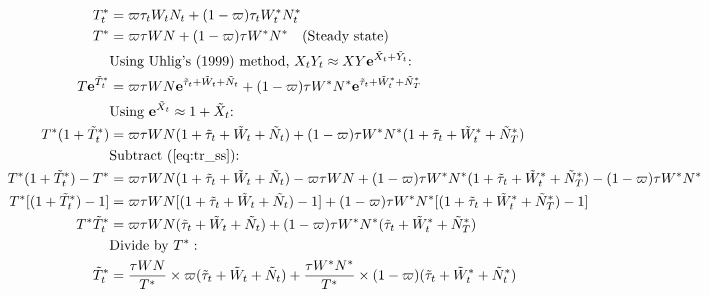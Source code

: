 \pagebreak
\tiny
\begin{align}
    T^*_t &= \varpi\tau_t W_t N_t + (1-\varpi)\tau_t W^*_t N^*_t \\
    T^* &= \varpi\tau W N + (1-\varpi)\tau W^* N^* \label{eq:tr_ss} \quad \text{(Steady state)}\\
    &\text{Using Uhlig's (1999) method, $X_tY_t \approx XY\mathbf{e}^{\tilde{X}_t + \tilde{Y}_t}$: }\\
    T\mathbf{e}^{\tilde{T}^*_t} &= \varpi \tau W N \mathbf{e}^{\tilde{\tau}_t+\tilde{W}_t+\tilde{N}_t} + (1-\varpi) \tau W^* N^* \mathbf{e}^{\tilde{\tau}_t+\tilde{W}^*_t+\tilde{N}^*_T} \\
    &\text{Using $\mathbf{e}^{\tilde{X}_t} \approx 1 + {\tilde{X}_t}$: }\\
    T^* (1 + {\tilde{T}^*_t}) &= \varpi \tau W N (1 + {\tilde{\tau}_t+\tilde{W}_t+\tilde{N}_t}) + (1-\varpi) \tau W^* N^* (1 + {\tilde{\tau}_t+\tilde{W}^*_t+\tilde{N}^*_T}) \\
    &\text{Subtract (\ref{eq:tr_ss}): } \\
    T^* (1 + {\tilde{T}^*_t}) - T^* &= \varpi \tau W N (1 + {\tilde{\tau}_t+\tilde{W}_t+\tilde{N}_t}) - \varpi\tau W N + (1-\varpi) \tau W^* N^* (1 + {\tilde{\tau}_t+\tilde{W}^*_t+\tilde{N}^*_T}) - (1-\varpi)\tau W^* N^* \\
    T^*[(1 + {\tilde{T}^*_t}) - 1] &= \varpi \tau W N [(1 + {\tilde{\tau}_t+\tilde{W}_t+\tilde{N}_t}) - 1] + (1-\varpi) \tau W^* N^* [(1 + {\tilde{\tau}_t+\tilde{W}^*_t+\tilde{N}^*_T}) - 1] \\
    T^*\tilde{T}^*_t &= \varpi \tau W N (\tilde{\tau}_t + \tilde{W}_t + \tilde{N}_t) + (1-\varpi) \tau W^* N^* (\tilde{\tau}_t+\tilde{W}^*_t+\tilde{N}^*_T) \\
    &\text{Divide by $T^*$}: \\
    \tilde{T}^*_t &= \frac{\tau W N}{T^*}\times \varpi (\tilde{\tau}_t + \tilde{W}_t + \tilde{N}_t) + \frac{\tau W^* N^*}{T^*} \times (1-\varpi) (\tilde{\tau}_t+\tilde{W}^*_t+\tilde{N}^*_t)
\end{align}

